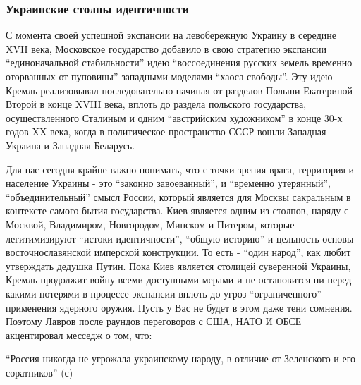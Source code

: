  
 
 
 
 

\subsubsection{Украинские столпы идентичности}
\label{sec:16_01_2022.stz.news.ua.hvylya.1.anatomia_vraga.9.ukrainskie_stolpy_identichnosti}

С момента своей успешной экспансии на левобережную Украину в середине XVII
века, Московское государство добавило в свою стратегию экспансии
\enquote{единоначальной стабильности} идею \enquote{воссоединения русских земель временно
оторванных от пуповины} западными моделями \enquote{хаоса свободы}. Эту идею Кремль
реализовывал последовательно начиная от разделов Польши Екатериной Второй в
конце XVIII века, вплоть до раздела польского государства, осуществленного
Сталиным и одним \enquote{австрийским художником} в конце 30-х годов XX века, когда в
политическое пространство СССР вошли Западная Украина и Западная Беларусь.

Для нас сегодня крайне важно понимать, что с точки зрения врага, территория и
население Украины - это \enquote{законно завоеванный}, и \enquote{временно утерянный},
\enquote{объединительный} смысл России, который является для Москвы сакральным в
контексте самого бытия государства. Киев является одним из столпов, наряду с
Москвой, Владимиром, Новгородом, Минском и Питером, которые легитимизируют
\enquote{истоки идентичности}, \enquote{общую историю} и цельность основы восточнославянской
имперской конструкции. То есть - \enquote{один народ}, как любит утверждать дедушка
Путин. Пока Киев является столицей суверенной Украины, Кремль продолжит войну
всеми доступными мерами и не остановится ни перед какими потерями в процессе
экспансии вплоть до угроз \enquote{ограниченного} применения ядерного оружия. Пусть у
Вас не будет в этом даже тени сомнения. Поэтому Лавров после раундов
переговоров с США, НАТО И ОБСЕ акцентировал месседж о том, что:

\enquote{Россия никогда не угрожала украинскому народу, в отличие от Зеленского и его
соратников} (с)

